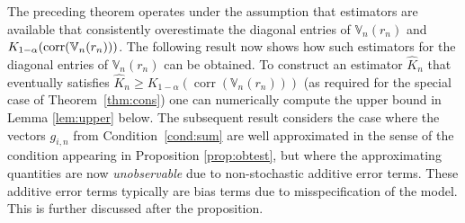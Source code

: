 \documentclass[preprint]{imsart}
\DeclareMathOperator{\corr}{corr}
\numberwithin{equation}{section}
\begin{document}
The preceding theorem operates under the assumption that estimators are available that consistently overestimate the diagonal entries of $\mathbb{V}_n(r_n)$ and ~$K_{1-\alpha}\linebreak[1](\corr(\mathbb{V}_n(r_n)))$. The following result now shows how such estimators for the diagonal entries of $\mathbb{V}_n(r_n)$ can be obtained. To construct an estimator $\hat{K}_n$ that eventually satisfies $\hat{K}_n \geq K_{1-\alpha}(\corr(\mathbb{V}_n(r_n)))$ (as required for the special case of Theorem~\ref{thm:cons}) one can numerically compute the upper bound in Lemma \ref{lem:upper} below. The subsequent result considers the case where the vectors $g_{i,n}$ from Condition~\ref{cond:sum} are well approximated in the sense of the condition appearing in Proposition \ref{prop:obtest}, but where the approximating quantities are now \textit{unobservable} due to non-stochastic additive error terms. These additive error terms typically are bias terms due to misspecification of the model. This is further discussed after the proposition.
\end{document}
